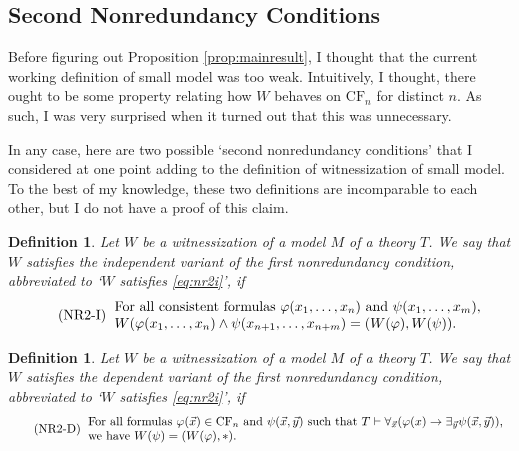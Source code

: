 \documentclass{article}
\newtheorem{definition}[theorem]{Definition}
\theoremstyle{nonumberplain}
\newcommand{\CF}{\mathrm{CF}}
\begin{document}
\subsection{Second Nonredundancy Conditions}\label{sec:nr2}

Before figuring out Proposition \ref{prop:mainresult}, I thought that the current working definition of small model was too weak. Intuitively, I thought, there ought to be some property relating how $W$ behaves on $\CF_n$ for distinct $n$. As such, I was very surprised when it turned out that this was unnecessary.

In any case, here are two possible `second nonredundancy conditions' that I considered at one point adding to the definition of witnessization of small model. To the best of my knowledge, these two definitions are incomparable to each other, but I do not have a proof of this claim.

\begin{definition}
Let $W$ be a witnessization of a model $M$ of a theory $T$. We say that $W$ satisfies the \emph{independent variant of the first nonredundancy condition}, abbreviated to `$W$ satisfies \eqref{eq:nr2i}', if
\begin{equation}
\tag{NR2-I}\label{eq:nr2i}
\begin{tabular}{l}
For all consistent formulas $\varphi(x_1, \dots, x_n)$ and $\psi(x_1, \dots, x_m)$,\\
$W(\varphi(x_1, \dots, x_n) \land \psi(x_{n+1}, \dots, x_{n+m}) = (W(\varphi), W(\psi))$.
\end{tabular}
\end{equation}
\end{definition}

\begin{definition}
Let $W$ be a witnessization of a model $M$ of a theory $T$. We say that $W$ satisfies the \emph{dependent variant of the first nonredundancy condition}, abbreviated to `$W$ satisfies \eqref{eq:nr2i}', if
\begin{equation}
\tag{NR2-D}\label{eq:nr2d}
\begin{tabular}{l}
For all formulas $\varphi(\vec x) \in \CF_n$ and $\psi(\vec x, \vec y)$ such that $T \vdash \forall_{\vec x} (\varphi(x) \rightarrow \exists_{\vec y} \psi(\vec x, \vec y))$,\\
we have $W(\psi) = (W(\varphi), *)$.
\end{tabular}
\end{equation}
\end{definition}
\end{document}

